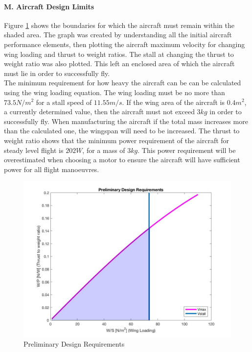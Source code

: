 \documentclass[12pt]{article}
\begin{document}
\paragraph{M. Aircraft Design Limits} Figure \ref{fig:acdesignreq} shows the boundaries for which the aircraft must remain within the shaded area. The graph was created by understanding all the initial aircraft performance elements, then plotting the aircraft maximum velocity for changing wing loading and thrust to weight ratios. The stall at changing the thrust to weight ratio was also plotted. This left an enclosed area of which the aircraft must lie in order to successfully fly. \\

\noindent The minimum requirement for how heavy the aircraft can be can be calculated using the wing loading equation. The wing loading must be no more than $73.5 N/m^2$ for a stall speed of $11.55m/s$. If the wing area of the aircraft is $0.4m^2$, a currently determined value, then the aircraft must not exceed $3kg$ in order to successfully fly. When manufacturing the aircraft if the total mass increases more than the calculated one, the wingspan will need to be increased. The thrust to weight ratio shows that the minimum power requirement of the aircraft for steady level flight is $202W$, for a mass of $3kg$. This power requirement will be overestimated when choosing a motor to ensure the aircraft will have sufficient power for all flight manoeuvres. \\

\begin{figure}[h]
\includegraphics[width=15cm, scale=1]{acdesignreq.png}
\caption{Preliminary Design Requirements}
\label{fig:acdesignreq}
\end{figure}
\end{document}
